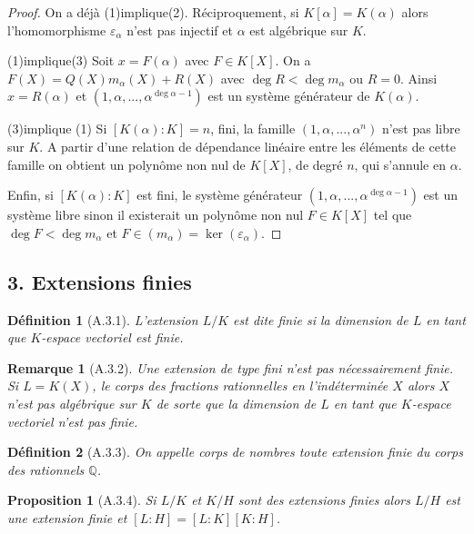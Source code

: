 \documentclass[12pts,a4paper]{report}
\newtheorem{definition}{Définition}
\newtheorem{proposition}{Proposition}
\newtheorem{remarque}{Remarque}
\begin{document}
\begin{proof}
On a déjà (1)implique(2). Réciproquement, si \( K[\alpha] = K(\alpha) \) alors l'homomorphisme \( \varepsilon_\alpha \) n'est pas injectif et \( \alpha \) est algébrique sur \( K \).

(1)implique(3) Soit \( x = F(\alpha) \) avec \( F \in K[X] \). On a \( F(X) = Q(X)m_\alpha(X) + R(X) \) avec \( \deg R < \deg m_\alpha \) ou \( R = 0 \). Ainsi \( x = R(\alpha) \) et \( (1, \alpha, ..., \alpha^{\deg \alpha - 1}) \) est un système générateur de \( K(\alpha) \).

(3)implique (1) Si \( [K(\alpha) : K] = n \), fini, la famille \( (1, \alpha, ..., \alpha^n) \) n'est pas libre sur \( K \). A partir d'une relation de dépendance linéaire entre les éléments de cette famille on obtient un polynôme non nul de \( K[X] \), de degré \( n \), qui s'annule en \( \alpha \).

Enfin, si \( [K(\alpha) : K] \) est fini, le système générateur \( (1, \alpha, ..., \alpha^{\deg \alpha - 1}) \) est un système libre sinon il existerait un polynôme non nul \( F \in K[X] \) tel que \( \deg F < \deg m_\alpha \) et \( F \in (m_\alpha) = \ker (\varepsilon_\alpha) \). \qedhere
\end{proof}

\subsection*{3. Extensions finies}

\begin{definition}[A.3.1]
L'extension \( L/K \) est dite finie si la dimension de \( L \) en tant que \( K \)-espace vectoriel est finie.
\end{definition}

\begin{remarque}[A.3.2]
Une extension de type fini n'est pas nécessairement finie. Si \( L = K(X) \), le corps des fractions rationnelles en l'indéterminée \( X \) alors \( X \) n'est pas algébrique sur \( K \) de sorte que la dimension de \( L \) en tant que \( K \)-espace vectoriel n'est pas finie.
\end{remarque}

\begin{definition}[A.3.3]
On appelle corps de nombres toute extension finie du corps des rationnels \( \mathbb{Q} \).
\end{definition}

\begin{proposition}[A.3.4]
Si \( L/K \) et \( K/H \) sont des extensions finies alors \( L/H \) est une extension finie et \([L:H] = [L:K][K:H]\).
\end{proposition}
\end{document}
